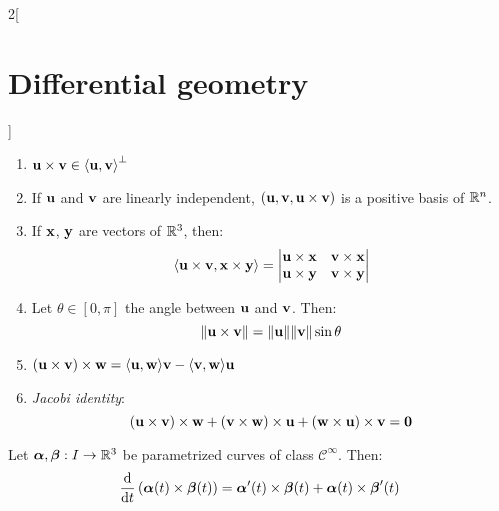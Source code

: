 \documentclass[../../../main.tex]{subfiles}
\begin{document}
\begin{multicols}{2}[\section{Differential geometry}]
\begin{proposition}
\begin{enumerate}
      \item $\vf{u}\times\vf{v}\in{\langle\vf{u},\vf{v}\rangle}^{\perp}$
      \item If $\vf{u}$ and $\vf{v}$ are linearly independent, $(\vf{u},\vf{v},\vf{u}\times\vf{v})$ is a positive basis of $\RR^n$.
      \item If $\vf{x}$, $\vf{y}$ are vectors of $\RR^3$, then: $$\langle\vf{u}\times\vf{v},\vf{x}\times\vf{y}\rangle=
              \begin{vmatrix}
                \vf{u}\times\vf{x} & \vf{v}\times\vf{x} \\
                \vf{u}\times\vf{y} & \vf{v}\times\vf{y} \\
              \end{vmatrix}$$
      \item Let $\theta\in[0,\pi]$ the angle between $\vf{u}$ and $\vf{v}$. Then: $$\|\vf{u}\times\vf{v}\|=\|\vf{u}\|\|\vf{v}\|\sin\theta$$
      \item $(\vf{u}\times\vf{v})\times\vf{w}=\langle\vf{u},\vf{w}\rangle\vf{v}-\langle\vf{v},\vf{w}\rangle\vf{u}$
      \item \emph{Jacobi identity}: $$(\vf{u}\times\vf{v})\times\vf{w}+(\vf{v}\times\vf{w})\times\vf{u}+(\vf{w}\times\vf{u})\times\vf{v}=\vf{0}$$
    \end{enumerate}
  \end{proposition}
  \begin{proposition}
    Let $\vf{\alpha},\vf{\beta}:I\rightarrow\RR^3$ be parametrized curves of class $\mathcal{C}^\infty$. Then:
    $$\dv{}{t}\left(\vf{\alpha}(t)\times\vf{\beta}(t)\right)=\vf{\alpha}'(t)\times\vf{\beta}(t)+\vf{\alpha}(t)\times\vf{\beta}'(t)$$
  \end{proposition}

\end{multicols}
\end{document}
